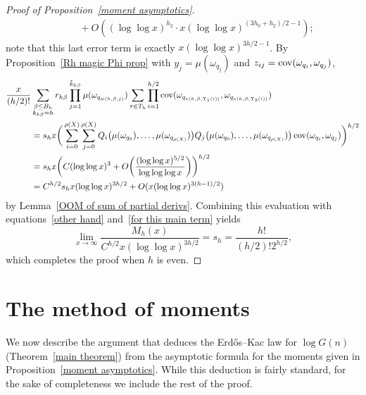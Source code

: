 \documentclass[12pt,reqno]{amsart}
\theoremstyle{definition}
\newcommand{\cov}{\mathop{\rm cov}\nolimits}
\begin{document}
\begin{proof}[Proof of Proposition~\ref{moment asymptotics}]
\begin{align}
&\qquad{}+ O( (\log\log x)^{h_2} \cdot x(\log\log x)^{(3h_0+h_2)/2 - 1} );  \label{for this main term}
\end{align}
note that this last error term is exactly $x(\log\log x)^{3h/2-1}$.
By Proposition~\ref{Rh magic Phi prop} with $y_j=\mu(\omega_{q_j})$ and $z_{ij}=\cov(\omega_{q_i},\omega_{q_j})$,
\begin{align*}
\frac x{(h/2)!} & \sum_{\substack{\beta\le B_h \\ k_{h\beta}=h}} r_{h\beta} \prod_{j=1}^{\tilde k_{h\beta}} \mu(\omega_{q_{w(h,\beta, j)}}) \sum_{\tau\in T_h} \prod_{i=1}^{h/2} \cov(\omega_{q_{v(h,\beta,\Upsilon_1(i))}},\omega_{q_{v(h,\beta,\Upsilon_2(i))}}) \\
&= s_h x \bigg( \sum_{i=0}^{\rho(X)} \sum_{j=0}^{\rho(X)} Q_i \big( \mu(\omega_{q_0}),\dots,\mu(\omega_{q_{\rho(X)}}) \big) Q_j\big( \mu(\omega_{q_0}),\dots,\mu(\omega_{q_{\rho(X)}}) \big) \cov(\omega_{q_i},\omega_{q_j}) \bigg)^{h/2} \\
&= s_h x \bigg(C (\log\log x)^3 + O\bigg(\frac{(\log\log x)^{5/2}}{\log\log\log x}\bigg)\bigg)^{h/2} \\
&= C^{h/2} s_h x (\log\log x)^{3h/2} + O(x(\log\log x)^{3(h - 1)/2})
\end{align*}
by Lemma~\ref{OOM of sum of partial derivs}.
Combining this evaluation with equations~\eqref{other hand} and~\eqref{for this main term} yields
\[
\lim_{x \to \infty} \frac{M_h(x)}{C^{h/2}x(\log\log x)^{3h/2}} = s_h = \frac{h!}{(h/2)!2^{h/2}},
\]
which completes the proof when $h$ is even.
\end{proof}


\section{The method of moments}\label{flourish}

We now describe the argument that deduces the Erd\H os--Kac law for $\log G(n)$ (Theorem~\ref{main theorem}) from the asymptotic formula for the moments given in Proposition~\ref{moment asymptotics}. While this deduction is fairly standard, for the sake of completeness we include the rest of the proof.
\end{document}
